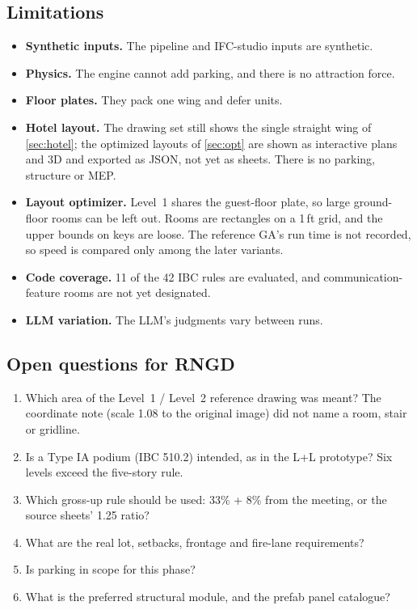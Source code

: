 \documentclass[10pt,a4paper]{article}
\theoremstyle{definition}
\begin{document}
\subsection{Limitations}
\begin{itemize}
\item \textbf{Synthetic inputs.} The pipeline and IFC-studio inputs are synthetic.
\item \textbf{Physics.} The engine cannot add parking, and there is no attraction force.
\item \textbf{Floor plates.} They pack one wing and defer units.
\item \textbf{Hotel layout.} The drawing set still shows the single straight wing of \cref{sec:hotel}; the optimized layouts of \cref{sec:opt} are shown as interactive plans and 3D and exported as JSON, not yet as sheets. There is no parking, structure or MEP.
\item \textbf{Layout optimizer.} Level~1 shares the guest-floor plate, so large ground-floor rooms can be left out. Rooms are rectangles on a 1\,ft grid, and the upper bounds on keys are loose. The reference GA's run time is not recorded, so speed is compared only among the later variants.
\item \textbf{Code coverage.} 11 of the 42 IBC rules are evaluated, and communication-feature rooms are not yet designated.
\item \textbf{LLM variation.} The LLM's judgments vary between runs.
\end{itemize}

\subsection{Open questions for RNGD}
\begin{enumerate}
\item Which area of the Level~1 / Level~2 reference drawing was meant? The coordinate note (scale 1.08 to the original image) did not name a room, stair or gridline.
\item Is a Type IA podium (IBC 510.2) intended, as in the L+L prototype? Six levels exceed the five-story rule.
\item Which gross-up rule should be used: 33\% + 8\% from the meeting, or the source sheets' 1.25 ratio?
\item What are the real lot, setbacks, frontage and fire-lane requirements?
\item Is parking in scope for this phase?
\item What is the preferred structural module, and the prefab panel catalogue?
\end{enumerate}
\end{document}
